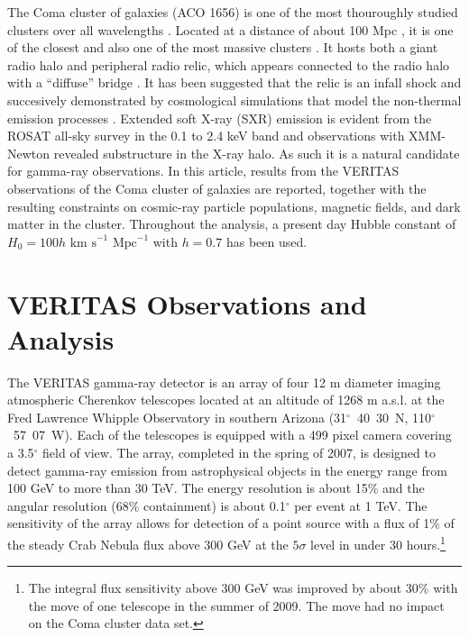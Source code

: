 \documentclass[12pt,manuscript]{aastex}
\begin{document}
The Coma cluster of galaxies (ACO 1656) is one of the most thouroughly studied clusters over all wavelengths \citep{article:Voges_etal:1999}. Located at a distance of about 100 Mpc \citep[$z=0.023$;][]{article:StrubleRood:1999}, it is one of the closest and also one of the most massive clusters \citep[$M \sim 10^{15}M_{\odot}$;][]{article:Smith:1983, article:Kubo_etal:2008}. It hosts both a giant radio halo \citep{article:Giovannini_etal:1993,article:Thierbach_etal:2003} and peripheral radio relic, which appears connected to the radio halo with a ``diffuse'' bridge \citep[see discussion in][]{article:BrownRudnick:2010}. It has been suggested that the relic is an infall shock \citep{article:Ensslin_etal:1998} and succesively demonstrated by cosmological simulations that model the non-thermal emission processes \citep{article:PfrommerEnsslinSpringel:2008, article:Pfrommer:2008, article:Battaglia_etal:2009, article:Skillman_etal:2011}. Extended soft X-ray (SXR) emission is evident from the ROSAT all-sky survey in the 0.1 to 2.4 keV band \citep{article:BrielHenryBohringer:1992} and observations with XMM-Newton \citep{article:Briel_etal:2001} revealed substructure in the X-ray halo. As such it is a natural candidate for gamma-ray observations. In this article, results from the VERITAS observations of the Coma cluster of galaxies are reported, together with the resulting constraints on cosmic-ray particle populations, magnetic fields, and dark matter in the cluster. Throughout the analysis, a present day Hubble constant of $H_0 = 100 h \mbox{ km s}^{-1} \mbox{ Mpc}^{-1}$ with $h=0.7$ has been used.

\section{VERITAS Observations and Analysis}
The VERITAS gamma-ray detector \citep{article:Weekes_etal:2002} is an array of four 12 m diameter imaging atmospheric Cherenkov telescopes \citep[IACTs;][]{article:Holder_etal:2006} located at an altitude of 1268 m a.s.l. at the Fred Lawrence Whipple Observatory in southern Arizona (31$^{\circ}$~40\arcmin~30\arcsec~N, 110$^{\circ}$~57\arcmin~07\arcsec~W). Each of the telescopes is equipped with a 499 pixel camera covering a 3.5$^{\circ}$ field of view. The array, completed in the spring of 2007, is designed to detect gamma-ray emission from astrophysical objects in the energy range from 100 GeV to more than 30 TeV. The energy resolution is about 15\% and the angular resolution (68\% containment) is about 0.1$^{\circ}$ per event at 1 TeV. The sensitivity of the array allows for detection of a point source with a flux of 1\% of the steady Crab Nebula flux above 300 GeV at the $5\sigma$ level in under 30 hours.\footnote{The integral flux sensitivity above 300 GeV was improved by about 30\% with the move of one telescope in the summer of 2009. The move had no impact on the Coma cluster data set.}
\end{document}
